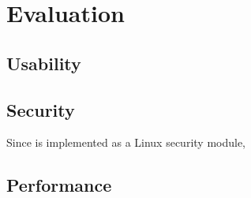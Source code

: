 \section{Evaluation}

\subsection{Usability}

\subsection{Security}

Since \bpfcontain{} is implemented as a Linux security module,

\subsection{Performance}
